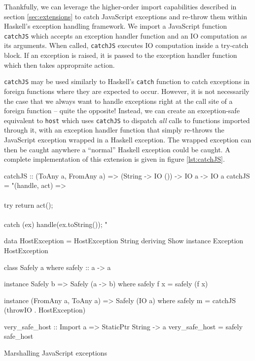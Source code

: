 \documentclass[preprint]{sigplanconf}
\begin{document}
Thankfully, we can leverage the higher-order import capabilities described
in section \ref{sec:extensions} to catch JavaScript exceptions and re-throw
them within Haskell's exception handling framework.
We import a JavaScript function \lstinline!catchJS! which accepts an
exception handler function and an IO computation as its arguments.
When called, \lstinline!catchJS! executes IO computation inside a try-catch
block. If an exception is raised, it is passed to the exception handler
function which then takes appropraite action.

\lstinline!catchJS! may be used similarly to Haskell's \lstinline!catch!
function to catch exceptions in foreign functions where they are expected to
occur.
However, it is not necessarily the case that we always want to handle
exceptions right at the call site of a foreign function -- quite the opposite!
Instead, we can create an exception-safe equivalent to \lstinline!host! which
uses \lstinline!catchJS! to dispatch \emph{all} calls to functions imported
through it, with an exception handler function that simply re-throws the
JavaScript exception wrapped in a Haskell exception. The wrapped exception
can then be caught anywhere a ``normal'' Haskell exception could be caught.
A complete implementation of this extension is given in
figure \ref{lst:catchJS}.

\begin{listingfloat}
\begin{code}
catchJS :: (ToAny a, FromAny a)
        => (String -> IO ())
        -> IO a -> IO a
catchJS = "(handle, act) =>\\
  \\{ try        { return act(); }\\
  \\  catch (ex) { handle(ex.toString()); }}"

data HostException = HostException String
  deriving Show
instance Exception HostException
  
class Safely a where
  safely :: a -> a

instance Safely b => Safely (a -> b) where
  safely f x = safely (f x)

instance (FromAny a, ToAny a) => Safely (IO a) where
  safely m = catchJS (throwIO . HostException)

very_safe_host :: Import a => StaticPtr String -> a
very_safe_host = safely safe_host
\end{code}
\caption{Marshalling JavaScript exceptions}
\label{lst:catchJS}
\end{listingfloat}
\end{document}
